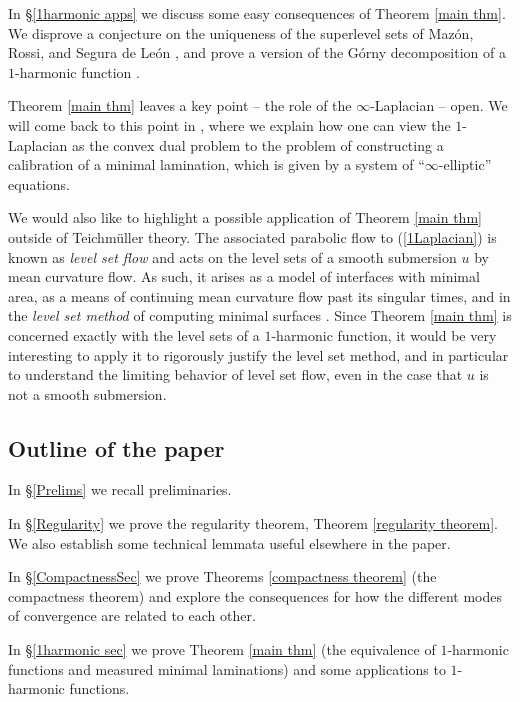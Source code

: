 \documentclass[reqno,11pt]{amsart}
\newcommand{\dfn}[1]{\emph{#1}\index{#1}}
\theoremstyle{definition}
\numberwithin{equation}{section}
\begin{document}
In \S\ref{1harmonic apps} we discuss some easy consequences of Theorem \ref{main thm}.
We disprove a conjecture on the uniqueness of the superlevel sets of Maz\'on, Rossi, and Segura de Le\'on \cite[Remark 2.8]{Mazon14}, and prove a version of the G\'orny decomposition of a $1$-harmonic function \cite[Theorem 1.2]{górny2017planar}.

Theorem \ref{main thm} leaves a key point -- the role of the $\infty$-Laplacian -- open.
We will come back to this point in \cite{BackusInfinityMaxwell1}, where we explain how one can view the $1$-Laplacian as the convex dual problem to the problem of constructing a calibration of a minimal lamination, which is given by a system of ``$\infty$-elliptic'' equations.

We would also like to highlight a possible application of Theorem \ref{main thm} outside of Teichm\"uller theory.
The associated parabolic flow to (\ref{1Laplacian}) is known as \dfn{level set flow} and acts on the level sets of a smooth submersion $u$ by mean curvature flow.
As such, it arises as a model of interfaces with minimal area, as a means of continuing mean curvature flow past its singular times, and in the \dfn{level set method} of computing minimal surfaces \cite{Evans91,Sethian90,Chen89,Thomas05}.
Since Theorem \ref{main thm} is concerned exactly with the level sets of a $1$-harmonic function, it would be very interesting to apply it to rigorously justify the level set method, and in particular to understand the limiting behavior of level set flow, even in the case that $u$ is not a smooth submersion.

\subsection{Outline of the paper}
In \S\ref{Prelims} we recall preliminaries.

In \S\ref{Regularity} we prove the regularity theorem, Theorem \ref{regularity theorem}.
We also establish some technical lemmata useful elsewhere in the paper.

In \S\ref{CompactnessSec} we prove Theorems \ref{compactness theorem} (the compactness theorem) and explore the consequences for how the different modes of convergence are related to each other.

In \S\ref{1harmonic sec} we prove Theorem \ref{main thm} (the equivalence of $1$-harmonic functions and measured minimal laminations) and some applications to $1$-harmonic functions.
\end{document}
